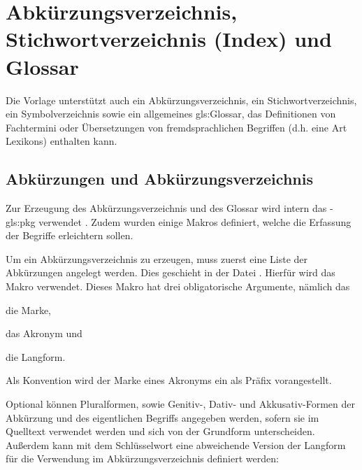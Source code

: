 \section{Abkürzungsverzeichnis, Stichwortverzeichnis (Index) und Glossar}%
\label{sec:Glossare}
%
Die Vorlage unterstützt auch ein Abkürzungsverzeichnis, ein Stichwortverzeichnis,
ein Symbolverzeichnis sowie ein allgemeines \gls{gls:Glossar},
das Definitionen von Fachtermini oder
Übersetzungen von fremdsprachlichen Begriffen
(d.h. eine Art Lexikons) enthalten kann.


\subsection{Abkürzungen und Abkürzungsverzeichnis}%
\label{sec:Akronyme}
Zur Erzeugung des Abkürzungsverzeichnis und des Glossar wird intern das
-\gls{gls:pkg} verwendet \cite{talbot2014}.
Zudem wurden einige Makros definiert, welche die Erfassung der Begriffe erleichtern sollen.

Um ein Abkürzungsverzeichnis zu erzeugen, muss zuerst eine Liste der Abkürzungen angelegt werden.
Dies geschieht in der Datei .
Hierfür wird das Makro  verwendet.
Dieses Makro hat drei obligatorische Argumente, nämlich das
\begin{itemize*}
\item die Marke,
\item das Akronym und
\item die Langform.
\end{itemize*}

Als Konvention wird der Marke eines Akronyms ein  als Präfix vorangestellt.

\begin{latex}[caption={Definition einer Abkürzung},label={lst:SimpleAcronymEntry}]
\end{latex}

Optional können Pluralformen, sowie Genitiv-, Dativ- und Akkusativ-Formen 
der Abkürzung und des eigentlichen Begriffs angegeben werden,
sofern sie im Quelltext verwendet werden und sich von der Grundform unterscheiden.
Außerdem kann mit dem Schlüsselwort 
eine abweichende Version der Langform für die Verwendung im Abkürzungsverzeichnis definiert werden:

